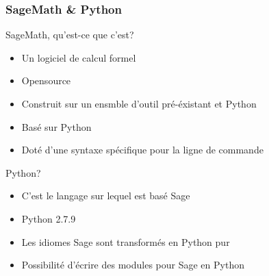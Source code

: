 \documentclass{beamer}
\begin{document}
\begin{frame}
\frametitle{SageMath \& Python}
\begin{center}
\begin{block}{SageMath, qu'est-ce que c'est?}
    \begin{itemize}
        \item Un logiciel de calcul formel
        \item Opensource
        \item Construit sur un ensmble d'outil pré-éxistant et Python
        \item Basé sur Python
        \item Doté d'une syntaxe spécifique pour la ligne de commande
    \end{itemize}
\end{block}
\begin{block}{Python?}
    \begin{itemize}
        \item {\large C'est le langage sur lequel est basé Sage}
        \item Python 2.7.9
        \item Les idiomes Sage sont transformés en Python pur
        \item Possibilité d'écrire des modules pour Sage en Python
    \end{itemize}
\end{block}
\end{center}
\end{frame}

\end{document}
